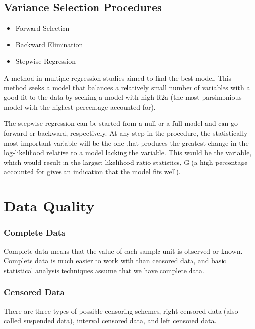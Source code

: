 \documentclass[12pt, a4paper]{report}
\begin{document}
\newpage
\section{Variance Selection Procedures}
\begin{itemize}
\item Forward Selection
\item Backward Elimination
\item Stepwise Regression
\end{itemize}

A method in multiple regression studies aimed to find the best model. This method seeks a model that balances a relatively small number of variables with a good fit to the data by seeking a model with high R2a (the most parsimonious model with the highest percentage accounted for).

The stepwise regression can be started from a null or a full model and can go forward or backward, respectively. At any step in the procedure, the statistically most important variable will be the one that produces the greatest change in the log-likelihood relative to a model lacking the variable. This would be the variable, which would result in the largest likelihood ratio statistics, G (a high percentage accounted for gives an indication that the model fits well).




\chapter{Data Quality}


\subsection{Complete Data}

Complete data means that the value of each sample unit is observed or known. Complete data is much easier to work with than censored data, and basic statistical analysis techniques assume that we have complete data.


\subsection{Censored Data}

There are three types of possible censoring schemes, right censored data (also called suspended data), interval censored data, and left censored data.
\end{document}

